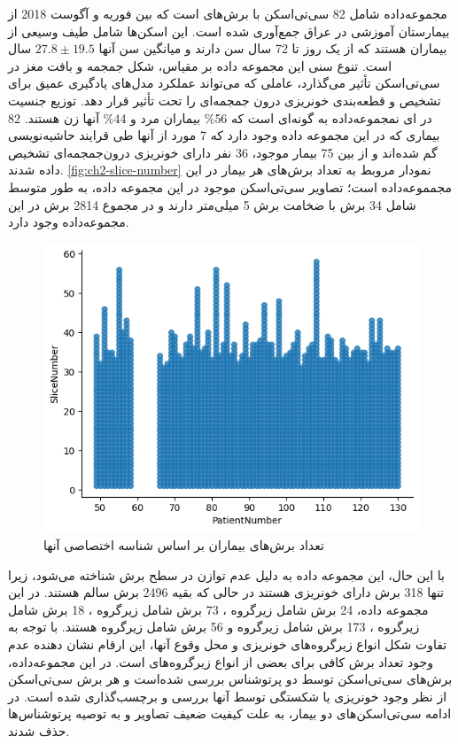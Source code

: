 مجموعه‌داده 
 شامل 82 سی‌تی‌اسکن با برش‌‌های 
است که بین فوریه و آگوست 2018 از بیمارستان آموزشی 
 در عراق جمع‌آوری شده است. این اسکن‌ها شامل طیف وسیعی از بیماران هستند که از یک روز تا 72 سال سن دارند و میانگین سن آنها 
 $27.8 \pm 19.5$
 سال است. تنوع سنی این مجموعه داده بر مقیاس، شکل جمجمه و بافت مغز در سی‌تی‌اسکن تأثیر می‌گذارد، عاملی که می‌تواند عملکرد مدل‌های یادگیری عمیق برای تشخیص و قطعه‌بندی خونریزی درون جمجمه‌ای را تحت تأثیر قرار دهد. توزیع جنسیت در ای نمجموعه‌داده به گونه‌ای است که 56\%  بیماران مرد و 44\% آنها زن هستند.
82 بیماری که در این مجموعه داده وجود دارد که 7 مورد از آنها طی قرایند حاشیه‌نویسی گم شده‌اند و از بین 75 بیمار موجود، 36 نفر دارای خونریزی درون‌جمجمه‌ای تشخیص داده شدند.
\autoref{fig:ch2-slice-number}
نمودار مروبط به تعداد برش‌های هر بیمار در این مجمموعه‌داده است؛ تصاویر سی‌تی‌اسکن موجود در این مجموعه داده،  به طور متوسط شامل 34 برش با ضخامت برش 5 میلی‌متر دارند و در مجموع 2814 برش در این مجموعه‌داده وجود دارد. 
\begin{figure}[H]
\centering
\includegraphics[width=1.0\linewidth]{"Images/Chapter2/Slice number"}
\caption{‌تعداد برش‌های بیماران بر اساس شناسه اختصاصی آنها}
\label{fig:ch2-slice-number}
\end{figure}

با این حال، این مجموعه داده به دلیل عدم توازن در سطح برش شناخته می‌شود، زیرا تنها 318 برش دارای خونریزی هستند در حالی که بقیه 2496 برش سالم هستند. در این مجموعه داده، 24 برش شامل زیرگروه
 ،
  73 برش شامل زیرگروه
 ، 
  18 برش شامل زیرگروه
 ،
173 برش شامل زیرگروه
 و 56 برش شامل زیرگروه 
هستند. با توجه به تفاوت شکل انواع زیرگروه‌های خونریزی و محل وقوع آنها، این ارقام نشان دهنده عدم وجود تعداد برش کافی برای بعضی از انواع زیرگروه‌های است.
در این مجموعه‌داده، برش‌های سی‌تی‌اسکن توسط دو پرتوشناس بررسی شده‌است و هر برش سی‌تی‌اسکن از نظر وجود خونریزی یا شکستگی توسط آنها بررسی و برچسب‌گذاری شده است. در ادامه سی‌تی‌اسکن‌های دو بیمار، به علت کیفیت ضعیف تصاویر و به توصیه پرتوشناس‌ها حذف شدند\cite{kyung2022improved}.

